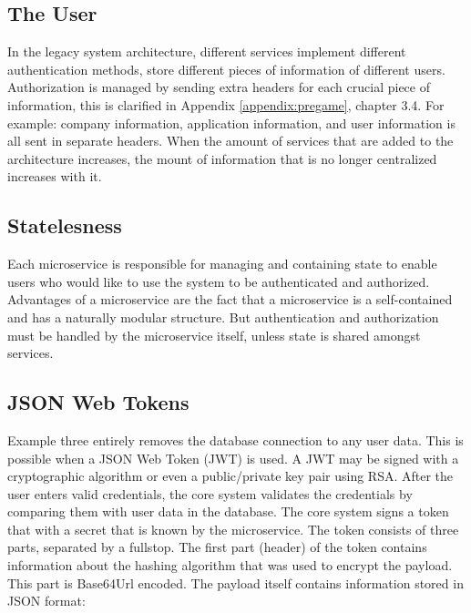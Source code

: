 \subsection{The User}
In the legacy system architecture, different services implement different authentication methods, store different pieces of information of different users. Authorization is managed by sending extra headers for each crucial piece of information, this is clarified in Appendix \ref{appendix:pregame}, chapter 3.4. For example: company information, application information, and user information is all sent in separate headers. When the amount of services that are added to the architecture increases, the mount of information that is no longer centralized increases with it.

\subsection{Statelesness}
Each microservice is responsible for managing and containing state to enable users who would like to use the system to be authenticated and authorized. Advantages of a microservice are the fact that a microservice is a self-contained and has a naturally modular structure. But authentication and authorization must be handled by the microservice itself, unless state is shared amongst services.

\subsection{JSON Web Tokens}
Example three entirely removes the database connection to any user data. This is possible when a JSON Web Token (JWT) is used. A JWT may be signed with a cryptographic algorithm or even a public/private key pair using RSA. After the user enters valid credentials, the core system validates the credentials by comparing them with user data in the database. The core system signs a token that with a secret that is known by the microservice. The token consists of three parts, separated by a fullstop. The first part (header) of the token contains information about the hashing algorithm that was used to encrypt the payload. This part is Base64Url encoded. The payload itself contains information stored in JSON format:


\begin{center}
\end{center}

